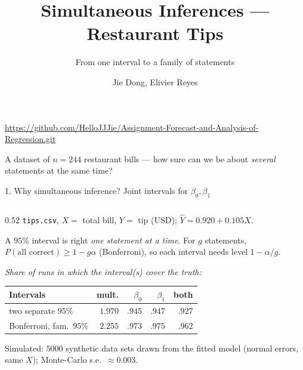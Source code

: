 \documentclass[aspectratio=169,11pt]{beamer}
\title[Simultaneous inferences]{Simultaneous Inferences --- Restaurant Tips}
\subtitle{From one interval to a family of statements}
\author[Jie Dong, Elivier Reyes]{Jie Dong, Elivier Reyes}
\date[IN6049]{}
\newcommand{\key}[1]{\textbf{\structure{#1}}}
\begin{document}
\begin{frame}
  \titlepage
  \vspace{-1.2em}
  \begin{center}
    \small{}\url{https://github.com/HelloJJJie/Assignment-Forecast-and-Analysis-of-Regression.git}

    \vspace{1.2em}
    A dataset of $n=244$ restaurant bills --- how sure can we be about
    \emph{several} statements at the same time?
  \end{center}
\end{frame}

\begin{frame}{1. Why simultaneous inference? Joint intervals for $\beta_0,\beta_1$}
  \begin{columns}[T]
  \begin{column}{0.52\textwidth}
    \small
    \key{Data.} \texttt{tips.csv}, $X=$ total bill, $Y=$ tip (USD);
    $\hat Y=0.920+0.105X$.

    \vspace{0.3em}
    \key{Problem.} A $95\%$ interval is right \emph{one statement at a time}.
    For $g$ statements, $P(\text{all correct})\ge 1-g\alpha$ (Bonferroni), so each
    interval needs level $1-\alpha/g$.

    \vspace{0.4em}
    {\scriptsize\textit{Share of runs in which the interval(s) cover the truth:}

    \vspace{0.1em}
    \begin{tabular}{@{}lrrrr@{}}
      \toprule
      Intervals & mult. & $\beta_0$ & $\beta_1$ & \textbf{both} \\
      \midrule
      two separate $95\%$     & $1.970$ & $.945$ & $.947$ & $\mathbf{.927}$ \\
      Bonferroni, fam.\ $95\%$ & $2.255$ & $.973$ & $.975$ & $\mathbf{.962}$ \\
      \bottomrule
    \end{tabular}}

    \vspace{0.2em}
    {\scriptsize Simulated: $5000$ synthetic data sets drawn from the fitted
     model (normal errors, same $X$); Monte-Carlo s.e.\ $\approx0.003$.\par}


\end{column}
\end{columns}
\end{frame}
\end{document}
